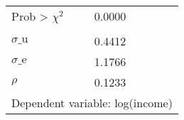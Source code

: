 {\begin{tabular}{l*{1}{cccc}}
Prob > $\chi^2$     &      0.0000&            &            &            \\
\\ $\sigma\text{\_u}$&      0.4412&            &            &            \\
$\sigma\text{\_e}$   &      1.1766&            &            &            \\
$\rho$              &      0.1233&            &            &            \\
\bottomrule
\multicolumn{5}{l}{\footnotesize Dependent variable: log(income)}\\
\end{tabular}
}
